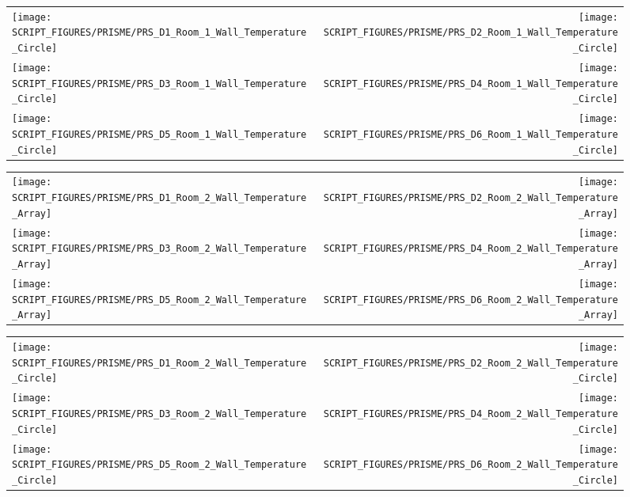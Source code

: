 \begin{figure}[p]
\begin{tabular*}{\textwidth}{l@{\extracolsep{\fill}}r}
\texttt{[image: SCRIPT\_FIGURES/PRISME/PRS\_D1\_Room\_1\_Wall\_Temperature\_Circle]} &
\texttt{[image: SCRIPT\_FIGURES/PRISME/PRS\_D2\_Room\_1\_Wall\_Temperature\_Circle]} \\
\texttt{[image: SCRIPT\_FIGURES/PRISME/PRS\_D3\_Room\_1\_Wall\_Temperature\_Circle]} &
\texttt{[image: SCRIPT\_FIGURES/PRISME/PRS\_D4\_Room\_1\_Wall\_Temperature\_Circle]} \\
\texttt{[image: SCRIPT\_FIGURES/PRISME/PRS\_D5\_Room\_1\_Wall\_Temperature\_Circle]} &
\texttt{[image: SCRIPT\_FIGURES/PRISME/PRS\_D6\_Room\_1\_Wall\_Temperature\_Circle]}
\end{tabular*}
\label{PRISME_Wall_Circle_Room_1}
\end{figure}

\begin{figure}[p]
\begin{tabular*}{\textwidth}{l@{\extracolsep{\fill}}r}
\texttt{[image: SCRIPT\_FIGURES/PRISME/PRS\_D1\_Room\_2\_Wall\_Temperature\_Array]} &
\texttt{[image: SCRIPT\_FIGURES/PRISME/PRS\_D2\_Room\_2\_Wall\_Temperature\_Array]} \\
\texttt{[image: SCRIPT\_FIGURES/PRISME/PRS\_D3\_Room\_2\_Wall\_Temperature\_Array]} &
\texttt{[image: SCRIPT\_FIGURES/PRISME/PRS\_D4\_Room\_2\_Wall\_Temperature\_Array]} \\
\texttt{[image: SCRIPT\_FIGURES/PRISME/PRS\_D5\_Room\_2\_Wall\_Temperature\_Array]} &
\texttt{[image: SCRIPT\_FIGURES/PRISME/PRS\_D6\_Room\_2\_Wall\_Temperature\_Array]}
\end{tabular*}
\label{PRISME_Wall_Array_Room_2}
\end{figure}

\begin{figure}[p]
\begin{tabular*}{\textwidth}{l@{\extracolsep{\fill}}r}
\texttt{[image: SCRIPT\_FIGURES/PRISME/PRS\_D1\_Room\_2\_Wall\_Temperature\_Circle]} &
\texttt{[image: SCRIPT\_FIGURES/PRISME/PRS\_D2\_Room\_2\_Wall\_Temperature\_Circle]} \\
\texttt{[image: SCRIPT\_FIGURES/PRISME/PRS\_D3\_Room\_2\_Wall\_Temperature\_Circle]} &
\texttt{[image: SCRIPT\_FIGURES/PRISME/PRS\_D4\_Room\_2\_Wall\_Temperature\_Circle]} \\
\texttt{[image: SCRIPT\_FIGURES/PRISME/PRS\_D5\_Room\_2\_Wall\_Temperature\_Circle]} &
\texttt{[image: SCRIPT\_FIGURES/PRISME/PRS\_D6\_Room\_2\_Wall\_Temperature\_Circle]}
\end{tabular*}
\label{PRISME_Wall_Circle_Room_2}
\end{figure}

